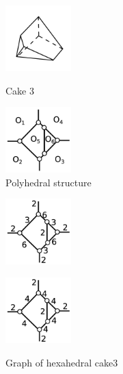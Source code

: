\documentclass[suppldata, dvipdfmx]{interact}
\theoremstyle{plain}%
\theoremstyle{definition}
\theoremstyle{remark}
\theoremstyle{problemstyle}
\begin{document}
\begin{figure}[h!tbp]
  \begin{minipage}[t]{0.5\textwidth}
   \centering
   \includegraphics[width=1in,
   keepaspectratio]{./img/HexahedraWithSphericalFaces/hexahedralCake3/cake3.jpg}
   \caption{Cake 3}
   \label{fig:cake3}
  \end{minipage}
 \hspace*{\fill}
  \begin{minipage}[t]{0.5\textwidth}
   \centering
   \includegraphics[width=1in, keepaspectratio]{./img/HexahedraWithSphericalFaces/hexahedralCake3/faces.jpg}
   \caption{Polyhedral structure}
   \label{fig:cake3polyhedralStructure}
  \end{minipage}
\end{figure}

\begin{figure}[h!tbp]
  \begin{minipage}[t]{0.5\textwidth}
   \centering
   \includegraphics[width=1in, keepaspectratio]{./img/HexahedraWithSphericalFaces/hexahedralCake3/a.jpg}
   \subcaption{}
   \label{fig:cake3a}
  \end{minipage}
 \hspace*{\fill}
  \begin{minipage}[t]{0.5\textwidth}
   \centering
   \includegraphics[width=1in, keepaspectratio]{./img/HexahedraWithSphericalFaces/hexahedralCake3/b.jpg}
   \subcaption{}
   \label{fig:cake3b}
  \end{minipage}
 \hspace*{\fill}
  \caption{Graph of hexahedral cake3}
  \label{fig:cake3list}
\end{figure}
\end{document}
